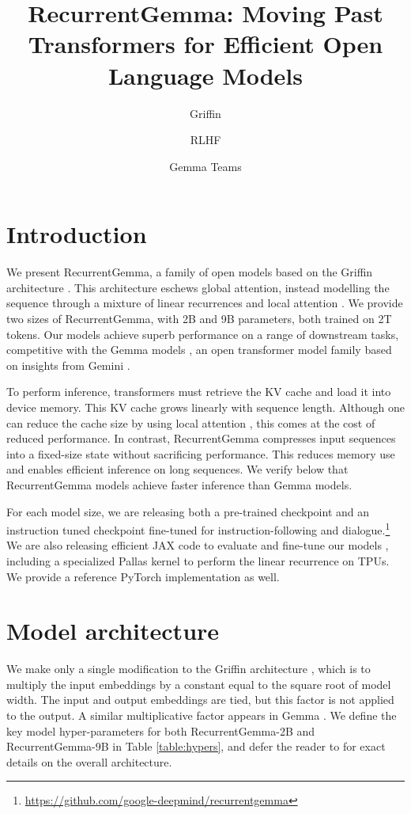 \documentclass[9pt, a4paper, logo, twocolumn, copyright, nonumbering]{googledeepmind}
\title{RecurrentGemma: Moving Past Transformers for Efficient Open Language Models}
\author[1]{{Griffin}}
\author[1]{{RLHF}}
\author[1]{{Gemma Teams}}
\affil[1]{Google DeepMind. Please see contributors and acknowledgements section for full author list.}
\begin{document}
\maketitle

\section{Introduction}

We present RecurrentGemma, a family of open models based on the Griffin architecture \citep{de2024griffin}. This architecture eschews global attention, instead modelling the sequence through a mixture of linear recurrences \citep{gu2021efficiently, orvieto2023resurrecting} and local attention \citep{beltagy2020longformer}. 
We provide two sizes of RecurrentGemma, with 2B and 9B parameters, both trained on 2T tokens. Our models achieve superb performance on a range of downstream tasks, competitive with the Gemma models \citep{gemma2024}, an open transformer model family based on insights from Gemini \citep{geminiteam2023gemini}.

To perform inference, transformers must retrieve the KV cache and load it into device memory. This KV cache grows linearly with sequence length. Although one can reduce the cache size by using local attention \citep{beltagy2020longformer}, this comes at the cost of reduced performance. In contrast, RecurrentGemma compresses input sequences into a fixed-size state without sacrificing performance. This reduces memory use and enables efficient inference on long sequences. We verify below that RecurrentGemma models achieve faster inference than Gemma models.

For each model size, we are releasing both a pre-trained checkpoint and an instruction tuned checkpoint fine-tuned for instruction-following and dialogue.\footnote{\url{https://github.com/google-deepmind/recurrentgemma}} We are also releasing efficient JAX code to evaluate and fine-tune our models \citep{bradbury2018jax}, including a specialized Pallas kernel to perform the linear recurrence on TPUs. We provide a reference PyTorch implementation as well.

\section{Model architecture}
We make only a single modification to the Griffin architecture \citep{de2024griffin}, which is to multiply the input embeddings by a constant equal to the square root of model width. The input and output embeddings are tied, but this factor is not applied to the output. A similar multiplicative factor appears in Gemma \citep{gemma2024}. 
We define the key model hyper-parameters for both RecurrentGemma-2B and RecurrentGemma-9B in Table \ref{table:hypers}, and defer the reader to \citet{de2024griffin} for exact details on the overall architecture. 
\end{document}

